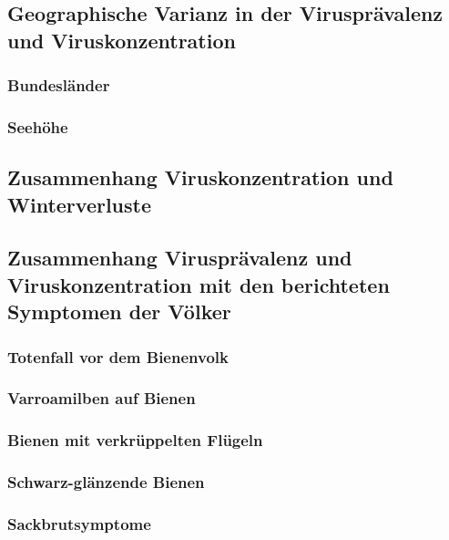 \blindtext

\subsection{Geographische Varianz in der Virusprävalenz und Viruskonzentration}
\subsubsection{Bundesländer}

\blindtext

\subsubsection{Seehöhe}

\blindtext

\subsection{Zusammenhang Viruskonzentration und Winterverluste}

\blindtext

\subsection{Zusammenhang Virusprävalenz und Viruskonzentration mit den berichteten
Symptomen der Völker}

\blindtext

\subsubsection{Totenfall vor dem Bienenvolk}

\blindtext

\subsubsection{Varroamilben auf Bienen}

\blindtext


\subsubsection{Bienen mit verkrüppelten Flügeln}

\blindtext

\subsubsection{Schwarz-glänzende Bienen}

\blindtext

\subsubsection{Sackbrutsymptome}

\blindtext
